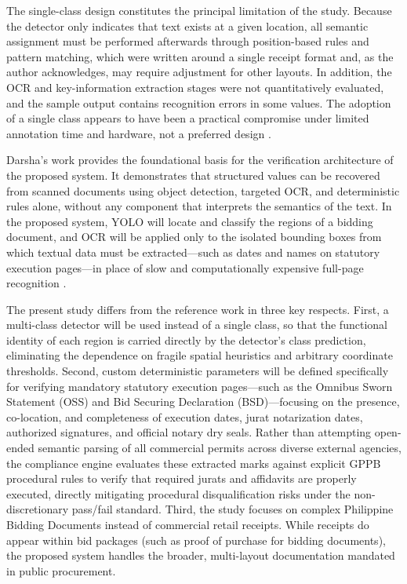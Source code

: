 The single-class design constitutes the principal limitation of the study.
Because the detector only indicates that text exists at a given location, all semantic assignment must be performed afterwards through position-based rules and pattern matching, which were written around a single receipt format and, as the author acknowledges, may require adjustment for other layouts.
In addition, the OCR and key-information extraction stages were not quantitatively evaluated, and the sample output contains recognition errors in some values.
The adoption of a single class appears to have been a practical compromise under limited annotation time and hardware, not a preferred design \cite{ref53}.

Darsha's work provides the foundational basis for the verification architecture of the proposed system.
It demonstrates that structured values can be recovered from scanned documents using object detection, targeted OCR, and deterministic rules alone, without any component that interprets the semantics of the text.
In the proposed system, YOLO will locate and classify the regions of a bidding document, and OCR will be applied only to the isolated bounding boxes from which textual data must be extracted—such as dates and names on statutory execution pages—in place of slow and computationally expensive full-page recognition \cite{ref53}.

The present study differs from the reference work in three key respects.
First, a multi-class detector will be used instead of a single class, so that the functional identity of each region is carried directly by the detector's class prediction, eliminating the dependence on fragile spatial heuristics and arbitrary coordinate thresholds.
Second, custom deterministic parameters will be defined specifically for verifying mandatory statutory execution pages—such as the Omnibus Sworn Statement (OSS) and Bid Securing Declaration (BSD)—focusing on the presence, co-location, and completeness of execution dates, jurat notarization dates, authorized signatures, and official notary dry seals.
Rather than attempting open-ended semantic parsing of all commercial permits across diverse external agencies, the compliance engine evaluates these extracted marks against explicit GPPB procedural rules to verify that required jurats and affidavits are properly executed, directly mitigating procedural disqualification risks under the non-discretionary pass/fail standard.
Third, the study focuses on complex Philippine Bidding Documents instead of commercial retail receipts.
While receipts do appear within bid packages (such as proof of purchase for bidding documents), the proposed system handles the broader, multi-layout documentation mandated in public procurement.

